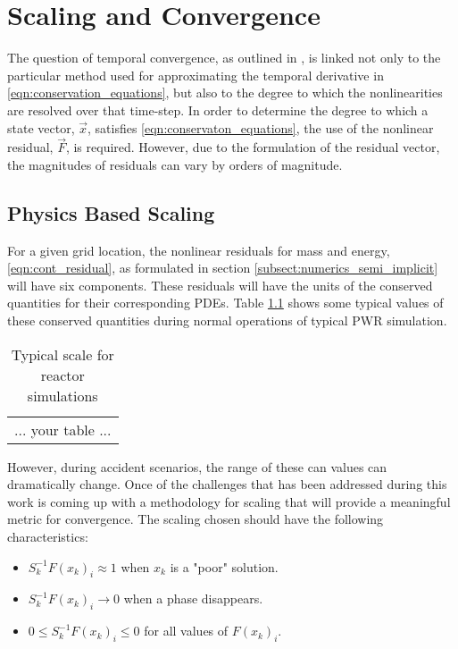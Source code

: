 \chapter{Scaling and Convergence}
\label{chap:scaling_and_convergence}
The question of temporal convergence, as outlined in , is linked not only to the particular method used for approximating the temporal derivative in \eqref{eqn:conservation_equations}, but also to the degree to which the nonlinearities are resolved over that time-step. 
In order to determine the degree to which a state vector, $\vec{x}$, satisfies \eqref{eqn:conservaton_equations}, the use of the nonlinear residual, $\vec{F}$, is required.
However, due to the formulation of the residual vector, the magnitudes of residuals can vary by orders of magnitude.

\section{Physics Based Scaling}
\label{sect:scaling}
For a given grid location, the nonlinear residuals for mass and energy, \eqref{eqn:cont_residual}, as formulated in section \ref{subsect:numerics_semi_implicit} will have six components.
These residuals will have the units of the conserved quantities for their corresponding PDEs.
Table \ref{tab:scaling_units_scales} shows some typical values of these conserved quantities during normal operations of typical PWR simulation.

\begin{table}[ht]
\centering
\begin{tabular}{|l|}
... your table ...
\end{tabular}
\caption{Typical scale for reactor simulations}
\label{tab:scaling_units_scales}
\end{table}

However, during accident scenarios, the range of these can values can dramatically change.
Once of the challenges that has been addressed during this work is coming up with a methodology for scaling that will provide a meaningful metric for convergence.
The scaling chosen should have the following characteristics:
\begin{itemize}
\item{$S^{-1}_k F(x_k)_i \approx 1$ when $x_k$ is a "poor" solution.}
\item{$S^{-1}_k F(x_k)_i \rightarrow 0$ when a phase disappears.}
\item{$0 \leq S^{-1}_k F(x_k)_i \leq 0 $ for all values of $F(x_k)_i$.}
\end{itemize}

